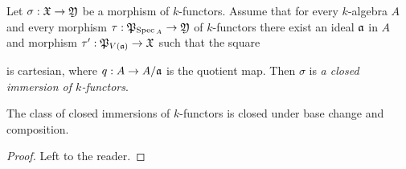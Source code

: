 \begin{definition}
Let $\sigma:{\mathfrak X}\rightarrow {\mathfrak Y}$ be a morphism of $k$-functors. Assume that for every $k$-algebra $A$ and every morphism $\tau:{\mathfrak P}_{\mathrm{Spec}\,_A}\rightarrow {\mathfrak Y}$ of $k$-functors there exist an ideal $\mathfrak{a}$ in $A$ and morphism $\tau':{\mathfrak P}_{V(\mathfrak{a})}\rightarrow {\mathfrak X}$ such that the square
\begin{center}
\end{center}
is cartesian, where $q:A\rightarrow A/\mathfrak{a}$ is the quotient map. Then $\sigma$ is \textit{a closed immersion of $k$-functors}.
\end{definition}

\begin{fact}\label{fact:closedimmersionsclosedunderbasechangeandcomposition}
The class of closed immersions of $k$-functors is closed under base change and composition.
\end{fact}
\begin{proof}
Left to the reader.
\end{proof}

